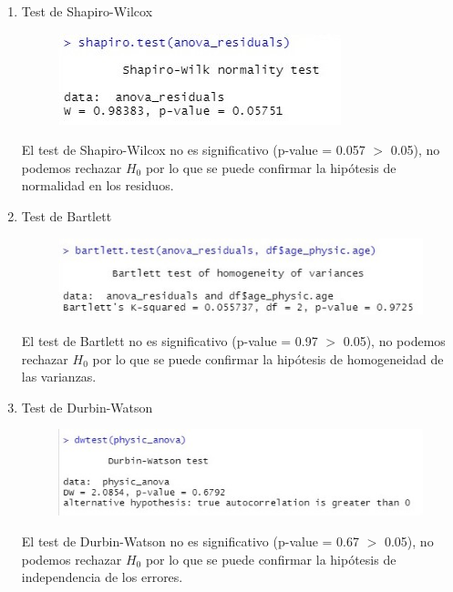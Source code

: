 \documentclass[a4paper,10pt,twocolumn]{article}
\begin{document}
\begin{enumerate}
	\item Test de Shapiro-Wilcox
	
	\begin{figure}[h]
		\includegraphics[scale=0.7]{./imgs/anova_shapiro.jpg}
	\end{figure}
	
	El test de Shapiro-Wilcox no es significativo (p-value = 0.057 $>$ 0.05), no podemos rechazar $H_{0}$ por lo que se puede confirmar la hipótesis de normalidad en los residuos.
	
	\item Test de Bartlett
	
	\begin{figure}[h]
		\includegraphics[scale=0.7]{./imgs/anova_bartlett.jpg}
	\end{figure}
	
	El test de Bartlett no es significativo (p-value = 0.97 $>$ 0.05), no podemos rechazar $H_{0}$ por lo que se puede confirmar la hipótesis de homogeneidad de las varianzas.
	
	\item Test de Durbin-Watson
	
	\begin{figure}[h]
		\includegraphics[scale=0.63]{./imgs/anova_dw.jpg}
	\end{figure}
	
	El test de Durbin-Watson no es significativo (p-value = 0.67 $>$ 0.05), no podemos rechazar $H_{0}$ por lo que se puede confirmar la hipótesis de independencia de los errores.
	
\end{enumerate}
\end{document}
